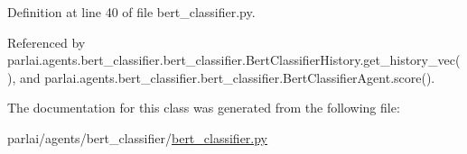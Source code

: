 Definition at line 40 of file bert\+\_\+classifier.\+py.



Referenced by parlai.\+agents.\+bert\+\_\+classifier.\+bert\+\_\+classifier.\+Bert\+Classifier\+History.\+get\+\_\+history\+\_\+vec(), and parlai.\+agents.\+bert\+\_\+classifier.\+bert\+\_\+classifier.\+Bert\+Classifier\+Agent.\+score().



The documentation for this class was generated from the following file\+:\begin{DoxyCompactItemize}
\item 
parlai/agents/bert\+\_\+classifier/\hyperlink{bert__classifier_8py}{bert\+\_\+classifier.\+py}\end{DoxyCompactItemize}
